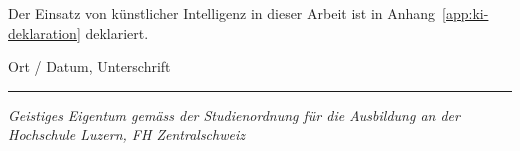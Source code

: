 \vspace{0.8em}
\noindent
Der Einsatz von künstlicher Intelligenz in dieser Arbeit ist in
Anhang~\ref{app:ki-deklaration} deklariert.

\vspace{3em}
\noindent
Ort / Datum, Unterschrift\quad\rule{9cm}{0.4pt}

\vspace{2em}
\noindent
{\small\itshape Geistiges Eigentum gemäss der Studienordnung für die Ausbildung
an der Hochschule Luzern, FH Zentralschweiz\par}

\clearpage
